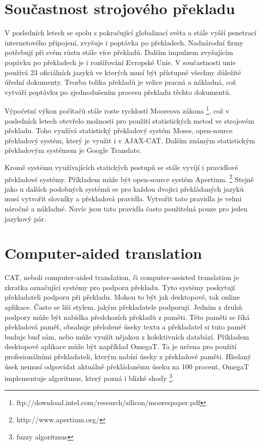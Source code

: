 \documentclass[12pt,a4paper]{report}
\begin{document}
\section{Součastnost strojového překladu}
V posledních letech se spolu s pokračující globalizací světa a stále vyšší penetrací internetového připojení, zvyšuje i poptávka po překladech. Nadnárodní firmy potřebují při svém růstu stále více překladů. Dalším impulzem zvyšujícím popávku po překladech je i rozšiřování Evropské Unie. V součastnosti unie používá 23 oficiálních jazyků ve kterých musí být přístupné všechny důležité úřední dokumenty. Tvorba tolika překladů je velice pracná a nákladná, což vytváří poptávku po zjednodušením procesu překladu těchto dokumentů.

Výpočetní výkon počítačů stále roste rychlostí Mooreova zákona \footnote{ftp://download.intel.com/research/silicon/moorespaper.pdf}, což v posledních letech otevřelo možnosti pro použití statistických metod ve strojovém překladu. Toho využívá statistický překladový systém Moses, open-source překladový systém, který je využit i v AJAX-CAT. Dalším známým statistickým překladovým systémem je Google Translate.

Kromě systému využívajících statických postupů se stále vyvíjí i pravidlové překladové systémy. Příkladem může být open-source systém Apertium. \footnote{http://www.apertium.org/} Stejně jako u dalších podobných systémů se pro každou dvojici překládaných jazyků musí vytvořit slovníky a překladová pravidla. Vytvořit tato pravidla je velmi náročné a nákladné. Navíc jsou tato pravidla často použitelná pouze pro jeden jazykový pár.

\section{Computer-aided translation}
CAT, neboli computer-aided translation, či computer-assisted translation je zkratka označující systémy pro podporu překladu. Tyto systémy poskytují překladateli podporu při překladu. Mohou to být jak desktopové, tak online aplikace. Často se liší stylem, jakým překladatele podporují. Jedním z druhů podpory může být nabídka předchozích překladů z paměti. Této paměti se říká překladová paměť, obsahuje přeložené úseky textu a překladatel si tuto paměť buduje buď sám, nebo může využít nějakou z kolektivních databází. Příkladem desktopové aplikace může být například OmegaT. Ta je určena pro použití profesionálními překladateli, kterým nabízí úseky z překladové paměti. Hledaný úsek nemusí odpovídat aktuálně překládanému úseku na 100 procent, OmegaT implementuje algoritmus, který pozná i blízké shody \footnote{fuzzy algoritmus}.
\end{document}
